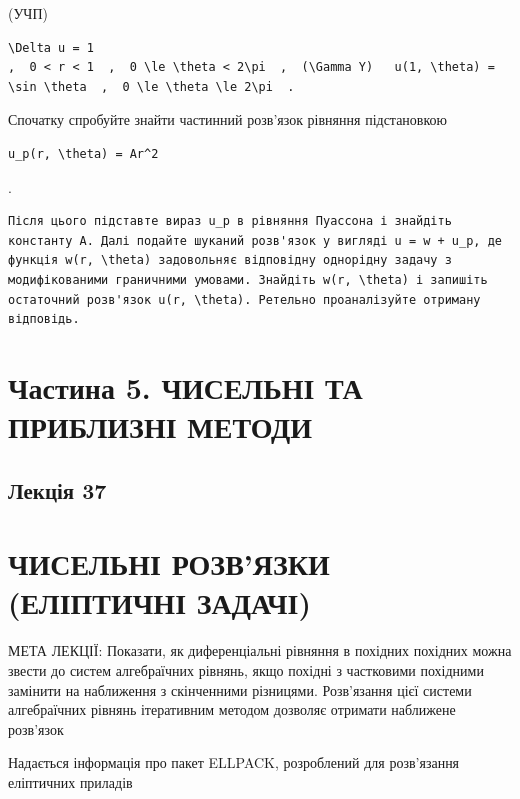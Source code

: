 \documentclass[
  ukrainian,
]{article}
\begin{document}
(УЧП)

\begin{verbatim}
\Delta u = 1
,  0 < r < 1  ,  0 \le \theta < 2\pi  ,  (\Gamma Y)   u(1, \theta) = \sin \theta  ,  0 \le \theta \le 2\pi  .
\end{verbatim}

Спочатку спробуйте знайти частинний розв'язок рівняння підстановкою

\begin{verbatim}
u_p(r, \theta) = Ar^2
\end{verbatim}

.

\begin{verbatim}
Після цього підставте вираз u_p в рівняння Пуассона і знайдіть константу A. Далі подайте шуканий розв'язок у вигляді u = w + u_p, де функція w(r, \theta) задовольняє відповідну однорідну задачу з модифікованими граничними умовами. Знайдіть w(r, \theta) і запишіть остаточний розв'язок u(r, \theta). Ретельно проаналізуйте отриману відповідь.
\end{verbatim}

\section{Частина 5. ЧИСЕЛЬНІ ТА ПРИБЛИЗНІ
МЕТОДИ}\label{ux447ux430ux441ux442ux438ux43dux430-5.-ux447ux438ux441ux435ux43bux44cux43dux456-ux442ux430-ux43fux440ux438ux431ux43bux438ux437ux43dux456-ux43cux435ux442ux43eux434ux438}

\subsection{Лекція 37}\label{ux43bux435ux43aux446ux456ux44f-37}

\section{ЧИСЕЛЬНІ РОЗВ'ЯЗКИ (ЕЛІПТИЧНІ
ЗАДАЧІ)}\label{ux447ux438ux441ux435ux43bux44cux43dux456-ux440ux43eux437ux432ux44fux437ux43aux438-ux435ux43bux456ux43fux442ux438ux447ux43dux456-ux437ux430ux434ux430ux447ux456}

МЕТА ЛЕКЦІЇ: Показати, як диференціальні рівняння в похідних похідних
можна звести до систем алгебраїчних рівнянь, якщо похідні з частковими
похідними замінити на наближення з скінченними різницями. Розв'язання
цієї системи алгебраїчних рівнянь ітеративним методом дозволяє отримати
наближене розв'язок

Надається інформація про пакет ELLPACK, розроблений для розв'язання
еліптичних приладів
\end{document}
